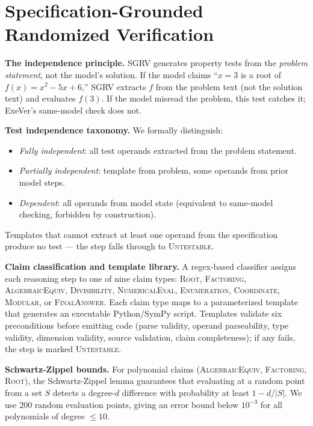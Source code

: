 \documentclass{article}
\begin{document}
\section{Specification-Grounded Randomized Verification}
\label{sec:method}

\textbf{The independence principle.} SGRV generates property tests from the \emph{problem statement}, not the model's solution. If the model claims ``$x = 3$ is a root of $f(x) = x^2 - 5x + 6$,'' SGRV extracts $f$ from the problem text (not the solution text) and evaluates $f(3)$. If the model misread the problem, this test catches it; ExeVer's same-model check does not.

\textbf{Test independence taxonomy.} We formally distinguish:
\begin{itemize}[leftmargin=*,itemsep=1pt]
\item \emph{Fully independent}: all test operands extracted from the problem statement.
\item \emph{Partially independent}: template from problem, some operands from prior model steps.
\item \emph{Dependent}: all operands from model state (equivalent to same-model checking, forbidden by construction).
\end{itemize}
Templates that cannot extract at least one operand from the specification produce no test --- the step falls through to \textsc{Untestable}.

\textbf{Claim classification and template library.} A regex-based classifier assigns each reasoning step to one of nine claim types: \textsc{Root}, \textsc{Factoring}, \textsc{AlgebraicEquiv}, \textsc{Divisibility}, \textsc{NumericalEval}, \textsc{Enumeration}, \textsc{Coordinate}, \textsc{Modular}, or \textsc{FinalAnswer}. Each claim type maps to a parameterized template that generates an executable Python/SymPy script. Templates validate six preconditions before emitting code (parse validity, operand parseability, type validity, dimension validity, source validation, claim completeness); if any fails, the step is marked \textsc{Untestable}.

\textbf{Schwartz-Zippel bounds.} For polynomial claims (\textsc{AlgebraicEquiv}, \textsc{Factoring}, \textsc{Root}), the Schwartz-Zippel lemma guarantees that evaluating at a random point from a set $S$ detects a degree-$d$ difference with probability at least $1 - d/|S|$. We use 200 random evaluation points, giving an error bound below $10^{-3}$ for all polynomials of degree $\leq 10$.
\end{document}
